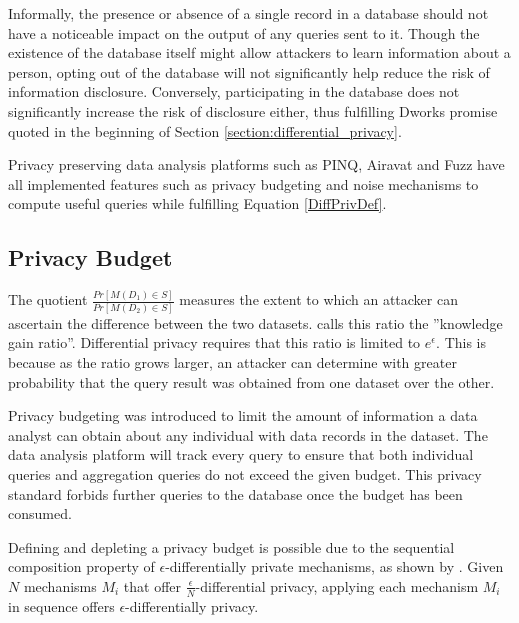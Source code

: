 Informally, the presence or absence of a single record in a database should not have a noticeable impact on the output of any queries sent to it. Though the existence of the database itself might allow attackers to learn information about a person, opting out of the database will not significantly help reduce the risk of information disclosure. Conversely, participating in the database does not significantly increase the risk of disclosure either, thus fulfilling Dworks promise quoted in the beginning of Section \ref{section:differential_privacy}.

Privacy preserving data analysis platforms such as PINQ\citep{mcsherry2009PINQ}, Airavat\citep{roy2010airavat} and Fuzz\citep{Haeberlen2011fuzz} have all implemented features such as privacy budgeting and noise mechanisms to compute useful queries while fulfilling Equation \ref{DiffPrivDef}.

\subsection{Privacy Budget}
\label{section:privacy_budget}
The quotient $\frac{Pr[M(D_1)\in S]}{Pr[M(D_2)\in S]}$ measures the extent to which an attacker can ascertain the difference between the two datasets\citep{abowd2008protective}. \cite{Sarathy2011evaluating} calls this ratio the ''knowledge gain ratio''. Differential privacy requires that this ratio is limited to $e^\epsilon$. This is because as the ratio grows larger, an attacker can determine with greater probability that the query result was obtained from one dataset over the other.

Privacy budgeting was introduced to limit the amount of information a data analyst can obtain about any individual with data records in the dataset. The data analysis platform will track every query to ensure that both individual queries and aggregation queries do not exceed the given budget. This privacy standard forbids further queries to the database once the budget has been consumed. 

Defining and depleting a privacy budget is possible due to the sequential composition property of $\epsilon$-differentially private mechanisms, as shown by \cite{mcsherry2009PINQ}. Given $N$ mechanisms $M_i$ that offer $\frac{\epsilon}{N}$-differential privacy, applying each mechanism $M_i$ in sequence offers $\epsilon$-differentially privacy.



